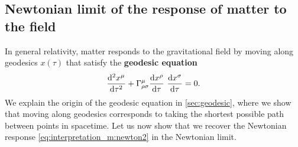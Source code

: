 \subsection{Newtonian limit of the response of matter to the field}

In general relativity, matter responds to the gravitational field by moving along geodesics $x(\tau)$ that satisfy the \textbf{geodesic equation}
\begin{equation}
	\odv[2]{x^\mu}{\tau} + \Gamma^\mu_{\rho \sigma} \odv{x^\rho}{\tau} \odv{x^\sigma}{\tau} = 0 .
	\label{eq:geodesic_duplicate}
\end{equation}
We explain the origin of the geodesic equation in \cref{sec:geodesic}, where we show that moving along geodesics corresponds to taking the shortest possible path between points in spacetime.
Let us now show that we recover the Newtonian response \eqref{eq:interpretation_m:newton2} in the Newtonian limit.

